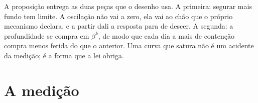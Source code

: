 A proposição entrega as duas peças que o desenho usa. A primeira: segurar mais fundo tem limite. A
oscilação não vai a zero, ela vai ao chão que o próprio mecanismo declara, e a partir dali a
resposta para de descer. A segunda: a profundidade se compra em $\beta^{k}$, de modo que cada dia a
mais de contenção compra menos ferida do que o anterior. Uma curva que satura não é um acidente da
medição; é a forma que a lei obriga.

\section{A medição}

\begin{table}[htbp]
  \centering
  \small
  \caption{A resposta dos dois mundos empatados, com \numDesenhoReplicatasPorCelula{} replicatas por
    contenção e \numDesenhoEspera{} dias de espera depois da soltura. A última coluna é o preço do
    desenho que declara exatamente a diferença medida naquela linha.}
  \label{tab:resposta}
\end{table}


